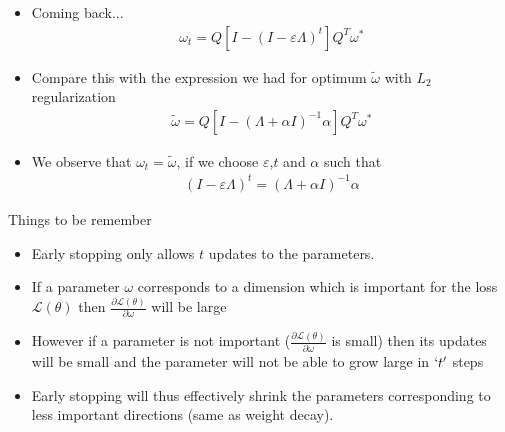 \begin{frame}
	\begin{itemize}
		\item<1-> Coming back...
		\begin{align*}
			\omega_t=Q[I-(I-\varepsilon \Lambda)^{t}]Q^{T}\omega^{*} 
		\end{align*}
		\justifying
		\item<2-> Compare this with the expression we had for optimum $\tilde{\omega}$ with $L_2$ regularization
		\begin{align*}
			\tilde{\omega}=Q[I-(\Lambda+ \alpha I)^{-1} \alpha]Q^{T}\omega^{*} 
		\end{align*}
		\item<3-> We observe that $\omega_t=\tilde{\omega}$, if we choose $
		\varepsilon$,$t$ and $\alpha$ such that 
		\begin{align*}
			(I-\varepsilon \Lambda)^{t}=(\Lambda+ \alpha I)^{-1} \alpha 
		\end{align*}
	\end{itemize}
\end{frame}

\begin{frame}
	\begin{block}{Things to be remember}
		\begin{itemize}
			\justifying
			\item<1-> Early stopping only allows $t$ updates to the parameters.
			\item<2-> If a parameter $\omega$ corresponds to a dimension which is important for the loss $\mathscr{L}(\theta)$ then $\frac{\partial \mathscr{L}(\theta)}{\partial \omega}$ will be large
			\item<4-> However if a parameter is not important ($\frac{\partial \mathscr{L}(\theta)}{\partial \omega}$ is small) then its updates will be small and the parameter will not be able to grow large in $`t'$ steps
			\item<5-> Early stopping will thus effectively shrink the parameters corresponding to less important directions (same as weight decay).
		\end{itemize}
	\end{block}
\end{frame}
